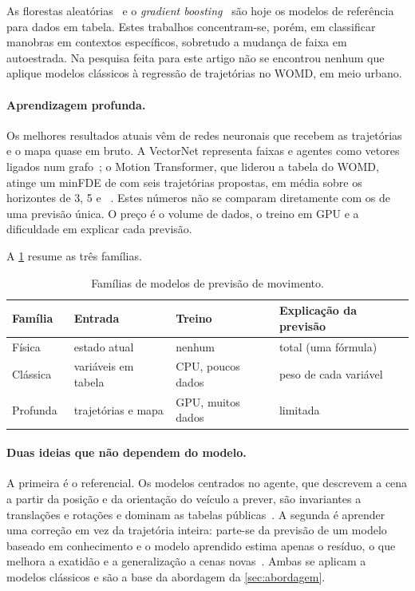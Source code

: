 As florestas aleatórias~\cite{breiman2001random} e o \emph{gradient
boosting}~\cite{friedman2001greedy} são hoje os modelos de referência
para dados em tabela. Estes trabalhos concentram-se, porém, em classificar
manobras em contextos específicos, sobretudo a mudança de faixa em
autoestrada. Na pesquisa feita para este artigo não se encontrou nenhum
que aplique modelos clássicos à regressão de trajetórias no WOMD, em meio
urbano.

\paragraph{Aprendizagem profunda.}
Os melhores resultados atuais vêm de redes neuronais que recebem as
trajetórias e o mapa quase em bruto. A VectorNet representa faixas e
agentes como vetores ligados num grafo~\cite{gao2020vectornet}; o Motion
Transformer, que liderou a tabela do WOMD, atinge um minFDE de
 com seis trajetórias propostas, em média sobre os horizontes
de 3, 5 e ~\cite{shi2022motion}. Estes números não se comparam
diretamente com os de uma previsão única. O preço é o volume de dados, o
treino em GPU e a dificuldade em explicar cada previsão.

A \cref{tab:familias} resume as três famílias.

\begin{table}[t]
\centering
\caption{Famílias de modelos de previsão de movimento.}
\label{tab:familias}
\begin{tabular*}{\textwidth}{@{\extracolsep{\fill}}llll@{}}
\toprule
Família & Entrada & Treino & Explicação da previsão \\
\midrule
Física~\cite{schubert2008comparison} & estado atual & nenhum & total (uma fórmula) \\
Clássica~\cite{wirthmuller2021teaching} & variáveis em tabela & CPU, poucos dados
  & peso de cada variável \\
Profunda~\cite{gao2020vectornet,shi2022motion} & trajetórias e mapa & GPU, muitos dados
  & limitada \\
\bottomrule
\end{tabular*}
\end{table}

\paragraph{Duas ideias que não dependem do modelo.}
A primeira é o referencial. Os modelos centrados no agente, que descrevem
a cena a partir da posição e da orientação do veículo a prever, são
invariantes a translações e rotações e dominam as tabelas
públicas~\cite{su2022narrowing,shi2022motion}. A segunda é aprender uma
correção em vez da trajetória inteira: parte-se da previsão de um modelo
baseado em conhecimento e o modelo aprendido estima apenas o resíduo, o
que melhora a exatidão e a generalização a cenas
novas~\cite{bahari2021injecting}. Ambas se aplicam a modelos clássicos e
são a base da abordagem da \cref{sec:abordagem}.

